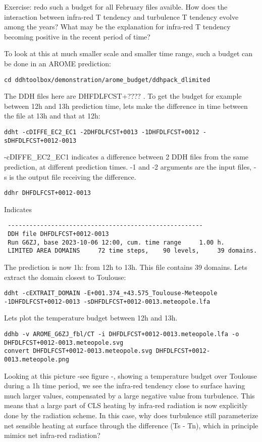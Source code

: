 \p Exercise: redo such a budget for all February files avaible. How does the interaction between infra-red T tendency and turbulence T tendency evolve among the years? What may be the explanation for infra-red T tendency becoming positive in the recent period of time?

\p To look at this at much smaller scale and smaller time range, such a budget can be done in an AROME prediction:

{\small \begin{verbatim} 
cd ddhtoolbox/demonstration/arome_budget/ddhpack_dlimited
\end{verbatim}}
\noi The DDH files here are DHFDLFCST+???? . To get the budget for example between 12h and 13h prediction time, lets make the difference in time between the file at 13h and that at 12h:
{\small \begin{verbatim} 
ddht -cDIFFE_EC2_EC1 -2DHFDLFCST+0013 -1DHFDLFCST+0012 -sDHFDLFCST+0012-0013
\end{verbatim}}
\noi -cDIFFE\_EC2\_EC1 indicates a difference between 2 DDH files from the same prediction, at different prediction times. -1 and -2 arguments are the input files, -s is the output file receiving the difference.
{\small \begin{verbatim} 
ddhr DHFDLFCST+0012-0013 
\end{verbatim}}
\noi Indicates
{\small \begin{verbatim} 
 ------------------------------------------------------
 DDH file DHFDLFCST+0012-0013
 Run G6ZJ, base 2023-10-06 12:00, cum. time range     1.00 h.
 LIMITED AREA DOMAINS     72 time steps,    90 levels,     39 domains.
\end{verbatim}}
\noi The prediction is now 1h: from 12h to 13h. This file contains 39 domains. Lets extract the domain closest to Toulouse:
{\tiny \begin{verbatim} 
ddht -cEXTRAIT_DOMAIN -E+001.374_+43.575_Toulouse-Meteopole -1DHFDLFCST+0012-0013 -sDHFDLFCST+0012-0013.meteopole.lfa
\end{verbatim}}

\noi Lets plot the temperature budget between 12h and 13h.
{\small \begin{verbatim} 
ddhb -v AROME_G6ZJ_fbl/CT -i DHFDLFCST+0012-0013.meteopole.lfa -o DHFDLFCST+0012-0013.meteopole.svg
convert DHFDLFCST+0012-0013.meteopole.svg DHFDLFCST+0012-0013.meteopole.png
\end{verbatim}}
\noi Looking at this picture -see figure -, showing a temperature budget over Toulouse during a 1h time period, we see the infra-red tendency close to surface having much larger values, compensated by a large negative value from turbulence. This means that a large part of CLS heating by infra-red radiation is now explicitly done by the radiation scheme. In this case, why does turbulence still parameterize net sensible heating at surface through the difference (Ts - Tn), which in principle mimics net infra-red radiation?

